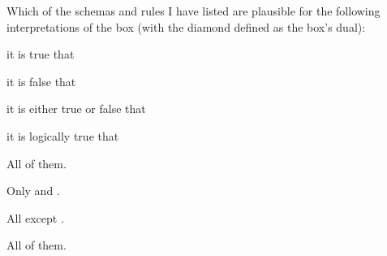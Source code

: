 \begin{exercise}
  Which of the schemas and rules I have listed are plausible for the following
  interpretations of the box (with the diamond defined as the box's dual):
  \begin{exlist}
    \item it is true that
    \item it is false that
    \item it is either true or false that
    \item it is logically true that
  \end{exlist}
\end{exercise}
\begin{solution}
  \begin{sollist}
  \item All of them.
  \item Only  and .
  \item All except .
  \item All of them.





\end{sollist}
\end{solution}
